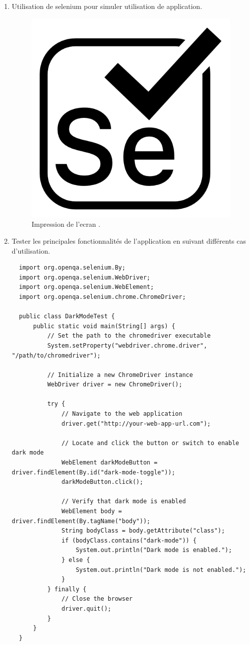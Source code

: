 \documentclass{article}
\begin{document}
\begin{enumerate}
    \item Utilisation de selenium pour simuler utilisation de application.
      \begin{figure}[H]
    \centering
    \includegraphics[width=0.5\linewidth]{assets/selenium.png}
    \caption{\label{fig:frog9} Impression de l'ecran .}
    \end{figure}
    \newpage
    \item Tester les principales fonctionnalités de l’application en suivant différents cas d’utilisation.
  
\begin{verbatim}
  import org.openqa.selenium.By;
  import org.openqa.selenium.WebDriver;
  import org.openqa.selenium.WebElement;
  import org.openqa.selenium.chrome.ChromeDriver;
  
  public class DarkModeTest {
      public static void main(String[] args) {
          // Set the path to the chromedriver executable
          System.setProperty("webdriver.chrome.driver", "/path/to/chromedriver");
  
          // Initialize a new ChromeDriver instance
          WebDriver driver = new ChromeDriver();
  
          try {
              // Navigate to the web application
              driver.get("http://your-web-app-url.com");
  
              // Locate and click the button or switch to enable dark mode
              WebElement darkModeButton = driver.findElement(By.id("dark-mode-toggle"));
              darkModeButton.click();
  
              // Verify that dark mode is enabled
              WebElement body = driver.findElement(By.tagName("body"));
              String bodyClass = body.getAttribute("class");
              if (bodyClass.contains("dark-mode")) {
                  System.out.println("Dark mode is enabled.");
              } else {
                  System.out.println("Dark mode is not enabled.");
              }
          } finally {
              // Close the browser
              driver.quit();
          }
      }
  }
  \end{verbatim}
\end{enumerate}
\end{document}
